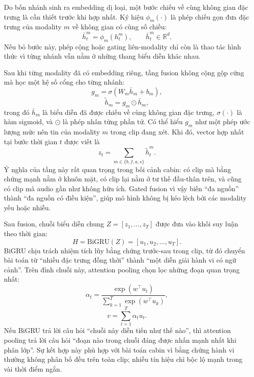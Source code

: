 \documentclass[conference,a4paper]{IEEEtran}
\begin{document}
Do bốn nhánh sinh ra embedding dị loại, một bước chiếu về cùng không gian đặc trưng là cần thiết trước khi hợp nhất. Ký hiệu $\phi_m(\cdot)$ là phép chiếu gọn đưa đặc trưng của modality $m$ về không gian có cùng số chiều:
\begin{equation}
\bar{h}^{m}_{t} = \phi_m(h^m_t), \qquad \bar{h}^{m}_{t} \in \mathbb{R}^{d}.
\end{equation}
Nếu bỏ bước này, phép cộng hoặc gating liên-modality chỉ còn là thao tác hình thức vì từng nhánh vẫn nằm ở những thang biểu diễn khác nhau.

Sau khi từng modality đã có embedding riêng, tầng fusion không cộng gộp cứng mà học một hệ số cổng cho từng nhánh:
\begin{equation}
g_m = \sigma(W_m \bar{h}_m + b_m),
\end{equation}
\begin{equation}
\tilde{h}_m = g_m \odot \bar{h}_m,
\end{equation}
trong đó $\bar{h}_m$ là biểu diễn đã được chiếu về cùng không gian đặc trưng, $\sigma(\cdot)$ là hàm sigmoid, và $\odot$ là phép nhân từng phần tử. Có thể hiểu $g_m$ như một phép ước lượng mức nên tin của modality $m$ trong clip đang xét. Khi đó, vector hợp nhất tại bước thời gian $t$ được viết là
\begin{equation}
z_t = \sum_{m \in \{b,f,a,s\}} \tilde{h}^{m}_t.
\end{equation}
Ý nghĩa của tầng này rất quan trọng trong bối cảnh cabin: có clip mà bằng chứng mạnh nằm ở khuôn mặt, có clip lại nằm ở tư thế đầu-thân trên, và cũng có clip mà audio gần như không hữu ích. Gated fusion vì vậy biến ``đa nguồn'' thành ``đa nguồn có điều kiện'', giúp mô hình không bị kéo lệch bởi các modality yếu hoặc nhiễu.

Sau fusion, chuỗi biểu diễn chung $Z = [z_1,\ldots,z_T]$ được đưa vào khối suy luận theo thời gian:
\begin{equation}
H = \mathrm{BiGRU}(Z) = [u_1, u_2, \ldots, u_T].
\end{equation}
BiGRU chịu trách nhiệm tích lũy bằng chứng trước-sau trong clip, từ đó chuyển bài toán từ ``nhiều đặc trưng đồng thời'' thành ``một diễn giải hành vi có ngữ cảnh''. Trên đỉnh chuỗi này, attention pooling chọn lọc những đoạn quan trọng nhất:
\begin{equation}
\alpha_t = \frac{\exp(w^\top u_t)}{\sum_{k=1}^{T} \exp(w^\top u_k)},
\end{equation}
\begin{equation}
v = \sum_{t=1}^{T} \alpha_t u_t.
\end{equation}
Nếu BiGRU trả lời câu hỏi ``chuỗi này diễn tiến như thế nào'', thì attention pooling trả lời câu hỏi ``đoạn nào trong chuỗi đáng được nhấn mạnh nhất khi phân lớp''. Sự kết hợp này phù hợp với bài toán cabin vì bằng chứng hành vi thường không phân bố đều trên toàn clip; nhiều tín hiệu chỉ bộc lộ mạnh trong vài thời điểm ngắn.
\end{document}
